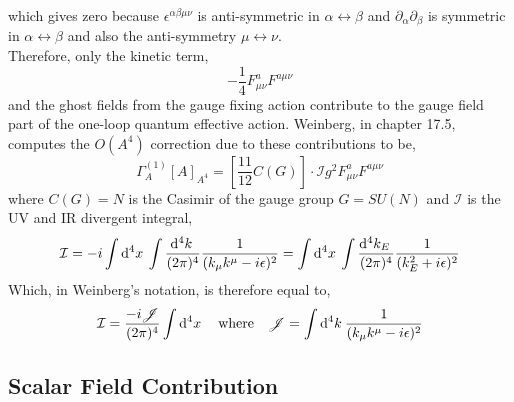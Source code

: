 \documentclass[12pt]{article}
\begin{document}
which gives zero because $\epsilon^{\alpha \beta \mu \nu}$ is anti-symmetric in $\alpha \leftrightarrow \beta$ and $\partial_\alpha \partial_\beta$ is symmetric in $\alpha \leftrightarrow \beta$ and also the anti-symmetry $\mu \leftrightarrow \nu$.
\bigskip\\
Therefore, only the kinetic term,
\[ - \frac{1}{4} F_{\mu \nu}^a F^{a \mu \nu}  \]
and the ghost fields from the gauge fixing action contribute to the gauge field part of the one-loop quantum effective action. Weinberg, in chapter 17.5, computes the $O(A^4)$ correction due to these contributions to be,
\[ \Gamma^{(1)}_A[A]_{A^4} = \left[ \frac{11}{12}  C(G) \right] \cdot \mathcal{I} g^2  F_{\mu\nu}^a F^{a \mu \nu} \]
where $C(G) = N$ is the Casimir of the gauge group $G = SU(N)$ and $\mathcal{I}$ is the UV and IR divergent integral,
\[ \mathcal{I} = -i \int \mathrm{d}^{4} x \: \int \frac{\mathrm{d}^{4} k \:}{(2 \pi)^4} \frac{1}{(k_\mu k^\mu - i \epsilon)^2} =  \int \mathrm{d}^{4} x \: \int \frac{\mathrm{d}^{4} k_E \:}{(2 \pi)^4} \frac{1}{(k_E^2 + i \epsilon)^2}   \]
Which, in Weinberg's notation, is therefore equal to,
\[ \mathcal{I} = \frac{-i \mathscr{J}}{(2 \pi)^4} \int \mathrm{d}^{4} x \: \quad \text{where} \quad \mathscr{J} = \int \mathrm{d}^{4} k \: \frac{1}{(k_\mu k^\mu - i \epsilon)^2} \]
 
\subsection{Scalar Field Contribution}
\end{document}
